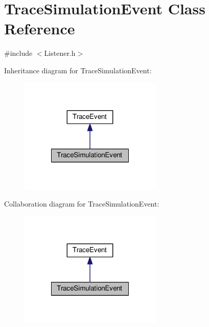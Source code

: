 \hypertarget{class_trace_simulation_event}{\section{Trace\-Simulation\-Event Class Reference}
\label{class_trace_simulation_event}
}


{\ttfamily \#include $<$Listener.\-h$>$}



Inheritance diagram for Trace\-Simulation\-Event\-:
\nopagebreak
\begin{figure}[H]
\begin{center}
\leavevmode
\includegraphics[width=192pt]{class_trace_simulation_event__inherit__graph}
\end{center}
\end{figure}


Collaboration diagram for Trace\-Simulation\-Event\-:
\nopagebreak
\begin{figure}[H]
\begin{center}
\leavevmode
\includegraphics[width=192pt]{class_trace_simulation_event__coll__graph}
\end{center}
\end{figure}
